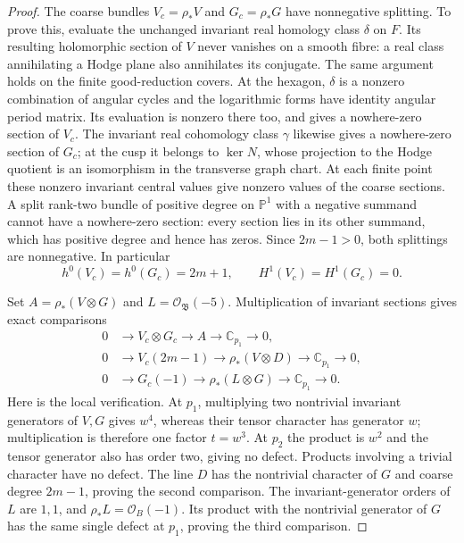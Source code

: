 \begin{proof}
The coarse bundles $V_c=\rho_*V$ and $G_c=\rho_*G$ have
nonnegative splitting. To prove this, evaluate the unchanged
invariant real homology class $\delta$ on $F$. Its resulting
holomorphic section of $V$ never vanishes on a smooth fibre:
a real class annihilating a Hodge plane also annihilates its
conjugate. The same argument holds on the finite good-reduction
covers. At the hexagon, $\delta$ is a nonzero combination of
angular cycles and the logarithmic forms have identity angular
period matrix. Its evaluation is nonzero there too, and gives
a nowhere-zero section of $V_c$. The invariant real cohomology
class $\gamma$ likewise gives a nowhere-zero section of $G_c$;
at the cusp it belongs to $\ker N$, whose projection to the
Hodge quotient is an isomorphism in the transverse graph chart.
At each finite point these nonzero invariant central values give
nonzero values of the coarse sections. A split rank-two bundle
of positive degree on $\mathbb P^1$ with a negative summand
cannot have a nowhere-zero section: every section lies in its
other summand, which has positive degree and hence has zeros.
Since $2m-1>0$, both splittings are nonnegative. In particular
\begin{equation}\label{eq:E15-positive}
 h^0(V_c)=h^0(G_c)=2m+1,\qquad H^1(V_c)=H^1(G_c)=0.
\end{equation}

Set $A=\rho_*(V\otimes G)$ and $L=\mathcal O_{\mathfrak B}(-5)$.
Multiplication of invariant sections gives exact comparisons
\begin{equation}\label{eq:E15-products}
\begin{split}
 0&\longrightarrow V_c\otimes G_c\longrightarrow A
       \longrightarrow\mathbb C_{p_1}\longrightarrow0,\\
 0&\longrightarrow V_c(2m-1)\longrightarrow\rho_*(V\otimes D)
       \longrightarrow\mathbb C_{p_1}\longrightarrow0,\\
 0&\longrightarrow G_c(-1)\longrightarrow\rho_*(L\otimes G)
       \longrightarrow\mathbb C_{p_1}\longrightarrow0.
\end{split}
\end{equation}
Here is the local verification. At $p_1$, multiplying two
nontrivial invariant generators of $V,G$ gives $w^4$, whereas
their tensor character has generator $w$; multiplication is
therefore one factor $t=w^3$. At $p_2$ the product is $w^2$
and the tensor generator also has order two, giving no defect.
Products involving a trivial character have no defect. The
line $D$ has the nontrivial character of $G$ and coarse degree
$2m-1$, proving the second comparison. The invariant-generator
orders of $L$ are $1,1$, and $\rho_*L=\mathcal O_B(-1)$.
Its product with the nontrivial generator of $G$ has the same
single defect at $p_1$, proving the third comparison.


\end{proof}
